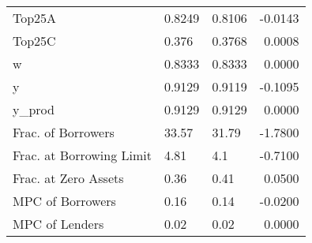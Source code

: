 \begin{table}
\begin{tabular}{lllr}
                  Top25A &  0.8249 &   0.8106 & -0.0143 \\
                  Top25C &   0.376 &   0.3768 &  0.0008 \\
                       w &  0.8333 &   0.8333 &  0.0000 \\
                       y &  0.9129 &   0.9119 & -0.1095 \\
                  y\_prod &  0.9129 &   0.9129 &  0.0000 \\
      Frac. of Borrowers &   33.57 &    31.79 & -1.7800 \\
Frac. at Borrowing Limit &    4.81 &      4.1 & -0.7100 \\
    Frac. at Zero Assets &    0.36 &     0.41 &  0.0500 \\
        MPC of Borrowers &    0.16 &     0.14 & -0.0200 \\
          MPC of Lenders &    0.02 &     0.02 &  0.0000 \\
\bottomrule
\end{tabular}
\end{table}
